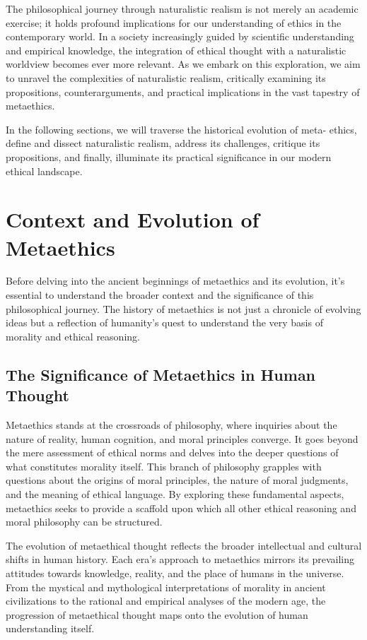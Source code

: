 \documentclass[12pt,a4paper]{article}
\begin{document}
The philosophical journey through naturalistic realism is not merely an academic exercise; it holds profound implications for our understanding of ethics in the contemporary world. In a society increasingly guided by scientific understanding and empirical knowledge, the integration of ethical thought with a naturalistic worldview becomes ever more relevant. As we embark on this exploration, we aim to unravel the complexities of naturalistic realism, critically examining its propositions, counterarguments, and practical implications in the vast tapestry of metaethics.

In the following sections, we will traverse the historical evolution of meta- ethics, define and dissect naturalistic realism, address its challenges, critique its propositions, and finally, illuminate its practical significance in our modern ethical landscape.

\section{Context and Evolution of Metaethics}

Before delving into the ancient beginnings of metaethics and its evolution, it's essential to understand the broader context and the significance of this philosophical journey. The history of metaethics is not just a chronicle of evolving ideas but a reflection of humanity's quest to understand the very basis of morality and ethical reasoning.

\subsection{The Significance of Metaethics in Human Thought}
Metaethics stands at the crossroads of philosophy, where inquiries about the nature of reality, human cognition, and moral principles converge. It goes beyond the mere assessment of ethical norms and delves into the deeper questions of what constitutes morality itself. This branch of philosophy grapples with questions about the origins of moral principles, the nature of moral judgments, and the meaning of ethical language. By exploring these fundamental aspects, metaethics seeks to provide a scaffold upon which all other ethical reasoning and moral philosophy can be structured.

The evolution of metaethical thought reflects the broader intellectual and cultural shifts in human history. Each era's approach to metaethics mirrors its prevailing attitudes towards knowledge, reality, and the place of humans in the universe. From the mystical and mythological interpretations of morality in ancient civilizations to the rational and empirical analyses of the modern age, the progression of metaethical thought maps onto the evolution of human understanding itself.
\end{document}
